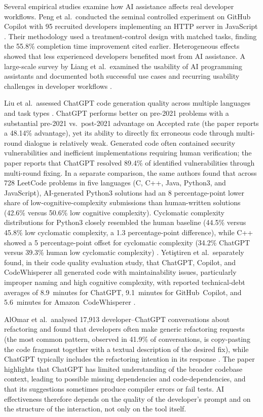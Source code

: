 \documentclass[12pt,a4paper]{report}
\begin{document}
Several empirical studies examine how AI assistance affects real developer workflows. Peng et al.\ conducted the seminal controlled experiment on GitHub Copilot with 95 recruited developers implementing an HTTP server in JavaScript \parencite{peng2023impact}. Their methodology used a treatment-control design with matched tasks, finding the 55.8\% completion time improvement cited earlier. Heterogeneous effects showed that less experienced developers benefited most from AI assistance. A large-scale survey by Liang et al.\ examined the usability of AI programming assistants and documented both successful use cases and recurring usability challenges in developer workflows \parencite{liang2024survey}.

Liu et al.\ assessed ChatGPT code generation quality across multiple languages and task types \parencite{liu2024chatgpt}. ChatGPT performs better on pre-2021 problems with a substantial pre-2021 vs.\ post-2021 advantage on Accepted rate (the paper reports a 48.14\% advantage), yet its ability to directly fix erroneous code through multi-round dialogue is relatively weak. Generated code often contained security vulnerabilities and inefficient implementations requiring human verification; the paper reports that ChatGPT resolved 89.4\% of identified vulnerabilities through multi-round fixing. In a separate comparison, the same authors found that across 728 LeetCode problems in five languages (C, C++, Java, Python3, and JavaScript), AI-generated Python3 solutions had an 8 percentage-point lower share of low-cognitive-complexity submissions than human-written solutions (42.6\% versus 50.6\% low cognitive complexity). Cyclomatic complexity distributions for Python3 closely resembled the human baseline (44.5\% versus 45.8\% low cyclomatic complexity, a 1.3 percentage-point difference), while C++ showed a 5 percentage-point offset for cyclomatic complexity (34.2\% ChatGPT versus 39.3\% human low cyclomatic complexity) \parencite{liu2024chatgpt}. Yetiştiren et al.\ separately found, in their code quality evaluation study, that ChatGPT, Copilot, and CodeWhisperer all generated code with maintainability issues, particularly improper naming and high cognitive complexity, with reported technical-debt averages of 8.9~minutes for ChatGPT, 9.1~minutes for GitHub~Copilot, and 5.6~minutes for Amazon~CodeWhisperer \parencite{yetistiren2023evaluating}.

AlOmar et al.\ analysed 17,913 developer--ChatGPT conversations about refactoring and found that developers often make generic refactoring requests (the most common pattern, observed in 41.9\% of conversations, is copy-pasting the code fragment together with a textual description of the desired fix), while ChatGPT typically includes the refactoring intention in its response \parencite{alomar2024refactoring}. The paper highlights that ChatGPT has limited understanding of the broader codebase context, leading to possible missing dependencies and code-dependencies, and that its suggestions sometimes produce compiler errors or fail tests. AI effectiveness therefore depends on the quality of the developer's prompt and on the structure of the interaction, not only on the tool itself.
\end{document}

